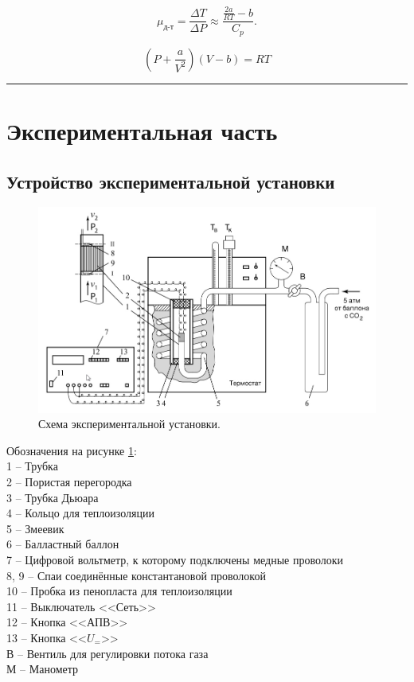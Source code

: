 \documentclass[a4paper,12pt]{article} %
\begin{document}
\begin{equation}\label{vander}
\mu_\text{д-т} = \frac{\Delta T}{\Delta P} \approx \frac{\frac{2a}{RT} - b}{C_p}.
\end{equation}

\begin{equation}\label{gas}
\left( P + \frac{a}{V^2} \right) \left( V - b \right) = RT
\end{equation}


\medskip\hrule\medskip

\section{Экспериментальная часть}

\subsection{Устройство экспериментальной установки}


\begin{figure}[h]
\centering
\includegraphics[scale=0.4]{setup.jpg}
\caption{Схема экспериментальной установки.}
\label{fig:setup}
\end{figure}


Обозначения на рисунке \ref{fig:setup}:\\
1 -- Трубка\\
2 -- Пористая перегородка\\
3 -- Трубка Дьюара\\
4 -- Кольцо для теплоизоляции\\
5 -- Змеевик\\
6 -- Балластный баллон\\
7 -- Цифровой вольтметр, к которому подключены медные проволоки\\
8, 9 -- Спаи соединённые константановой проволокой\\
10 -- Пробка из пенопласта для теплоизоляции\\
11 -- Выключатель <<Сеть>>\\
12 -- Кнопка <<АПВ>>\\
13 -- Кнопка <<$U_=$>>\\
В -- Вентиль  для регулировки потока газа\\
М -- Манометр\\
\end{document}
